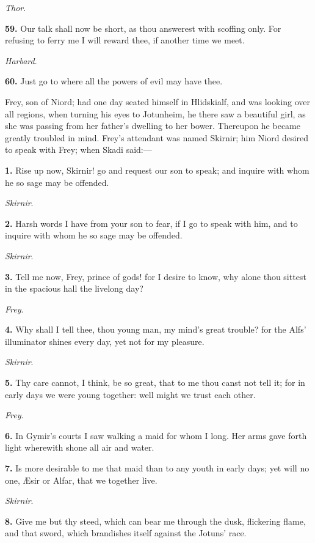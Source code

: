 \emph{Thor}.

\textbf{59.} Our talk shall now be short, as thou answerest with scoffing
only. For refusing to ferry me I will reward thee, if another time we
meet.

\emph{Harbard}.

\textbf{60.} Just go to where all the powers of evil may have thee.


Frey, son of Niord; had one day seated himself in Hlidskialf, and was
looking over all regions, when turning his eyes to Jotunheim, he there
saw a beautiful girl, as she was passing from her father's dwelling to
her bower. Thereupon he became greatly troubled in mind. Frey's
attendant was named Skirnir; him Niord desired to speak with Frey;
when Skadi said:—

\textbf{1.} Rise up now, Skirnir! go and request our son to speak; and
inquire with whom he so sage may be offended.

\emph{Skirnir}.

\textbf{2.} Harsh words I have from your son to fear, if I go to speak with
him, and to inquire with whom he so sage may be offended.

\emph{Skirnir}.

\textbf{3.} Tell me now, Frey, prince of gods! for I desire to know, why
alone thou sittest in the spacious hall the livelong day?

\emph{Frey}.

\textbf{4.} Why shall I tell thee, thou young man, my mind's great trouble?
for the Alfs' illuminator shines every day, yet not for my pleasure.

\emph{Skirnir}.

\textbf{5.} Thy care cannot, I think, be so great, that to me thou canst not
tell it; for in early days we were young together: well might we trust
each other.

\emph{Frey}.

\textbf{6.} In Gymir's courts I saw walking a maid for whom I long. Her arms
gave forth light wherewith shone all air and water.

\textbf{7.} Is more desirable to me that maid than to any youth in early
days; yet will no one, Æsir or Alfar, that we together live.

\emph{Skirnir}.

\textbf{8.} Give me but thy steed, which can bear me through the dusk,
flickering flame, and that sword, which brandishes itself against the
Jotuns' race.

